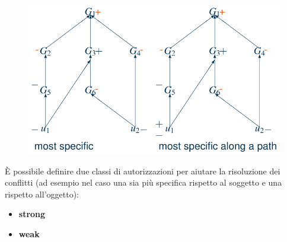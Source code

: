 \documentclass{report}
\begin{document}
\begin{figure}[H]
    \centering
    \includegraphics[width=0.7\linewidth]{images/conflict.png}
\end{figure}

\noindent È possibile definire due classi di autorizzazioni per aiutare 
la risoluzione dei conflitti (ad esempio nel caso una sia più specifica 
rispetto al soggetto e una rispetto all'oggetto):
\begin{itemize}
    \item \textbf{strong}
    \item \textbf{weak}
\end{itemize}
\end{document}

